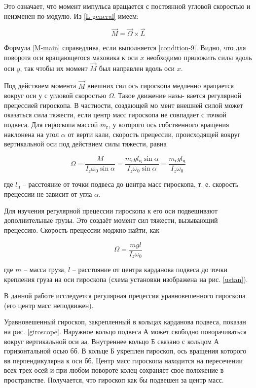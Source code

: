 \documentclass[a4paper,12pt]{article}
\begin{document}
Это означает, что момент импульса вращается с постоянной угловой скоростью и неизменен по модулю. Из \eqref{L-general} имеем:

\begin{equation}\label{M-main}
    \vec{M} = \vec{\Omega} \times \vec{L}
\end{equation}

Формула \eqref{M-main} справедлива, если выполняется \eqref{condition-9}. Видно, что для поворота оси вращающегося маховика к оси $x$ необходимо приложить силы вдоль оси $y$, так чтобы их момент $\vec{M}$ был направлен вдоль оси $x$.

Под действием момента $\vec{M}$ внешних сил ось гироскопа медленно вращается вокруг оси $у$ с угловой скоростью $\Omega$. Такое движение назы- вается регулярной прецессией гироскопа. В частности, создающей мо мент внешней силой может оказаться сила тяжести, если центр масс гироскопа не совпадает с точкой подвеса. Для гироскопа массой $m_{\text{г}}$, у которого ось собственного вращения наклонена на угол $\alpha$ от верти кали, скорость прецессии, происходящей вокруг вертикальной оси под действием силы тяжести, равна

\begin{equation}
    \Omega = \frac{M}{I_{z} \omega_{0} \sin \alpha} = \frac{m_{\text{г}} g l_{\text{ц}} \sin \alpha}{I_{z} \omega_{0} \sin \alpha} = \frac{m_{\text{г}} g l_{\text{ц}}}{I_{z} \omega_{0}}
\end{equation}

где $l_{\text{ц}}$ -- расстояние от точки подвеса до центра масс гироскопа, т. е. скорость прецессии не зависит от угла $\alpha$.

Для изучения регулярной прецессии гироскопа к его оси подвешивают дополнительные грузы. Это создаёт момент сил тяжести, вызывающий прецессию. Скорость прецессии моджно найти, как

\begin{equation}\label{prec-speed}
    \Omega = \frac{m g l}{I_{z} \omega_{0}}
\end{equation}

где $m$ -- масса груза, $l$ -- расстояние от центра карданова подвеса до точки крепления груза на оси гироскопа (схема установки изображена на рис. \ref{ustan}).

В данной работе исследуется регулярная прецессия уравновешенного гироскопа (его центр масс неподвижен).

Уравновешенный гироскоп, закрепленный в кольцах карданова подвеса, показан на рис. \ref{giroscope}. Наружное кольцо подвеса $А$ может свободно поворачиваться вокруг вертикальной оси $\textit{аа}$. Внутреннее кольцо $\text{Б}$ связано с кольцом $\text{А}$ горизонтальной осью $\textit{бб}$. В кольце $\text{Б}$ укреплен гироскоп, ось вращения которого $\textit{вв}$ перпендикулярна к оси $\textit{бб}$. Центр масс гироскопа находится на пересечении всех трех осей и при любом повороте колец сохраняет свое положение в пространстве. Получается, что гироскоп как бы подвешен за центр масс.
\end{document}
